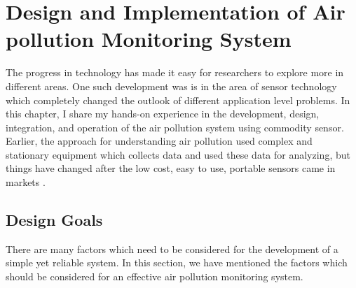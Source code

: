 
\chapter{Design and Implementation of Air pollution Monitoring System}



The progress in technology has made it easy for researchers to explore more in different areas. One such development was is in the area of sensor technology which completely changed the outlook of different application level problems. In this chapter, I share my hands-on experience in the development, design, integration, and operation of the air pollution system using commodity sensor. Earlier, the approach for understanding air pollution used complex and stationary equipment which collects data and used these data for analyzing, but things have changed after the low cost, easy to use, portable sensors came in markets \cite{Snyder2013}. 

\section{Design Goals}

There are many factors which need to be considered for the development of a simple yet reliable system. In this section, we have mentioned the factors which should be considered for an effective air pollution monitoring system.

